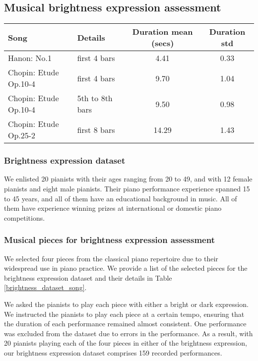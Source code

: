 \subsection{Musical brightness expression assessment}
\begin{table*}[h!]
  \caption{List of musical pieces for brightness assessment.}
  \begin{tabular}{l|lcc}
    \toprule
    Song & Details & Duration mean (secs) & Duration std \\
    \midrule
    Hanon: No.1     & first 4 bars & 4.41 & 0.33\\ \hline
    Chopin: Etude Op.10-4    & first 4 bars & 9.70 & 1.04\\ \hline
    Chopin: Etude Op.10-4    & 5th to 8th bars & 9.50 & 0.98\\ \hline
    Chopin: Etude Op.25-2     & first 8 bars & 14.29 & 1.43\\ \hline
  \end{tabular}
  \label{brightness_dataset_song}
\end{table*}

\subsubsection*{Brightness expression dataset}
We enlisted 20 pianists with their ages ranging from 20 to 49, and with 12 female pianists and eight male pianists. 
Their piano performance experience spanned 15 to 45 years, and all of them have an educational background in music. 
All of them have experience winning prizes at international or domestic piano competitions. 

\subsubsection*{Musical pieces for brightness expression assessment}
We selected four pieces from the classical piano repertoire due to their widespread use in piano practice.
We provide a list of the selected pieces for the brightness expression dataset and their details in Table \ref{brightness_dataset_song}.

We asked the pianists to play each piece with either a bright or dark expression. 
We instructed the pianists to play each piece at a certain tempo, ensuring that the duration of each performance remained almost consistent.
One performance was excluded from the dataset due to errors in the performance.
As a result, with 20 pianists playing each of the four pieces in either of the brightness expression, our brightness expression dataset comprises 159 recorded performances. 

